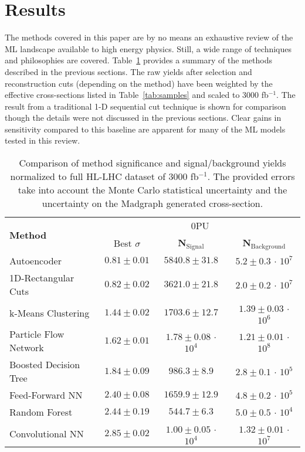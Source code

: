 \section{Results}
\label{sec:results}

The methods covered in this paper are by no means an exhaustive review of the ML landscape available to high energy physics. Still, a wide range of techniques and philosophies are covered. Table~\ref{tab:summary} provides a summary of the methods described in the previous sections. The raw yields after selection and reconstruction cuts (depending on the method) have been weighted by the effective cross-sections listed in Table~\ref{tab:samples} and scaled to 3000 fb$^{-1}$. The result from a traditional 1-D sequential cut technique is shown for comparison though the details were not discussed in the previous sections. Clear gains in sensitivity compared to this baseline are apparent for many of the ML models tested in this review.

\begin{table}[h!]
\label{tab:summary}
  \begin{center}
  \begin{tabular}{|l|c|c|c|} %
      \hline\hline
      \multirow{2}{*}{\textbf{Method}} & \multicolumn{3}{c|}{0PU} \\
      \cline{2-4}
      & Best $\sigma$ & \textbf{N$_{\mathrm{Signal}}$} & \textbf{N$_{\mathrm{Background}}$} \\
      \hline
      Autoencoder           & $0.81 \pm 0.01$ & $5840.8 \pm 31.8$ & $5.2\pm 0.3$ $\cdot$ $10^7$ \\
      1D-Rectangular Cuts   & $0.82 \pm 0.02$ & $3621.0 \pm 21.8$  & $2.0 \pm 0.2$ $\cdot$ $10^7$ \\
      k-Means Clustering    & $1.44 \pm 0.02$ & $1703.6 \pm 12.7$ & $1.39\pm 0.03$  $\cdot$ $10^6$ \\
      Particle Flow Network & $1.62 \pm 0.01$ & $1.78 \pm 0.08$ $\cdot$ $10^4$ & $1.21\pm 0.01$ $\cdot$ $10^8$ \\
      Boosted Decision Tree & $1.84 \pm 0.09$ & $986.3 \pm 8.9$  & $2.8 \pm 0.1$ $\cdot$ $10^5$ \\
      Feed-Forward NN       & $2.40 \pm 0.08$ & $1659.9 \pm 12.9$  & $4.8 \pm 0.2$ $\cdot$ $10^5$ \\
      Random Forest         & $2.44 \pm 0.19$ & $544.7 \pm 6.3$ & $5.0 \pm 0.5$ $\cdot$ $10^4$ \\
      Convolutional NN      & $2.85 \pm 0.02$ & $1.00\pm 0.05$ $\cdot$ $10^4$ & $1.32\pm 0.01$ $\cdot$ $10^7$ \\
      \hline\hline
    \end{tabular}
    \caption{Comparison of method significance and signal/background yields normalized to full HL-LHC dataset of 3000 fb$^{-1}$. The provided errors take into account the Monte Carlo statistical uncertainty and the uncertainty on the Madgraph generated cross-section.}
  \end{center}
\end{table}


